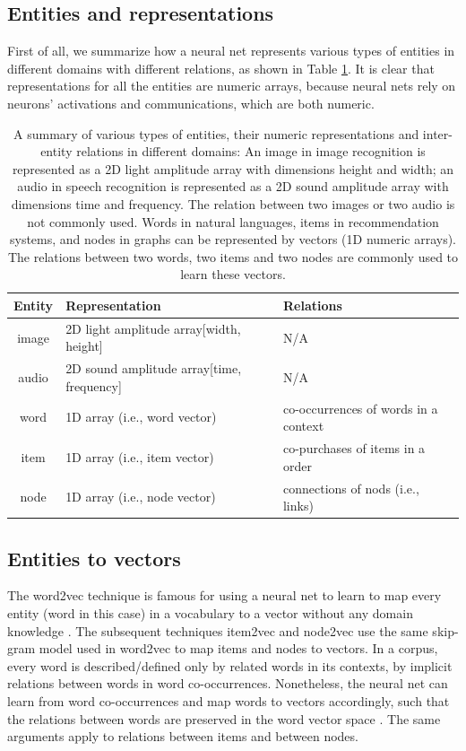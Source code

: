 \documentclass[letterpaper]{article}
\begin{document}
\subsection{Entities and representations}
First of all, we summarize how a neural net represents various types of 
entities in different domains with different relations, as shown in 
Table \ref{tab:domains}.
It is clear that representations for all the entities are numeric arrays, 
because neural nets rely on neurons' activations and communications, which 
are both numeric.
\begin{table}[!htb]
	\centering
	\caption{A summary of various types of entities, their numeric
		representations and inter-entity relations in different domains:
		An image in image recognition is represented as a 2D light amplitude 
		array with dimensions height and width; an audio in speech recognition 
		is represented as a 2D sound amplitude array with dimensions time and 
		frequency.
		The relation between two images or two audio is not commonly used. 
		Words in natural languages, items in recommendation systems, and nodes 
		in graphs can be represented by vectors (1D numeric arrays).
		The	relations between two words, two items and two nodes are commonly 
		used to learn these vectors.
	}
	\begin{tabularx}{1\textwidth}{|c|X|X|} \hline \rowcolor{blue!50}
		Entity & Representation               & Relations \\ \hline
		image  & 2D light amplitude array[width, height]      & N/A \\ \hline
		audio  & 2D sound amplitude array[time, frequency]    & N/A \\ \hline
		word   & 1D array (i.e., word vector) & co-occurrences of words in a context \\ \hline
		item   & 1D array (i.e., item vector) & co-purchases of items in a order \\ \hline
		node   & 1D array (i.e., node vector) & connections of nods (i.e., links) \\ \hline
	\end{tabularx}
	\label{tab:domains}
\end{table}

\subsection{Entities to vectors}
The word2vec technique is famous for using a neural net to learn to map every 
entity (word in this case) in a vocabulary to a vector without any domain 
knowledge \cite{mikolov2013efficient}.
The subsequent techniques item2vec \cite{barkan2016item2vec}
and node2vec \cite{grovernode2vec} use the same skip-gram 
model used in word2vec to map items and nodes to vectors.
In a corpus, every word is described/defined only by related words in its 
contexts, by implicit relations between words in word co-occurrences.
Nonetheless, the neural net can learn from word co-occurrences and map words to 
vectors accordingly,
such that the relations between words are preserved in the word vector space 
\cite{mikolov2013distributed}.
The same arguments apply to relations between items and between nodes.
\end{document}
